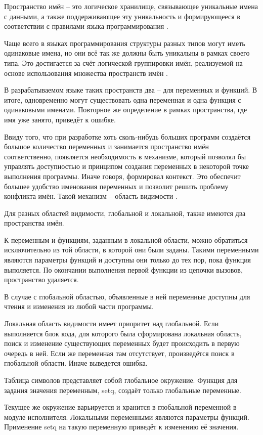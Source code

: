 Пространство имён -- это логическое хранилище, связывающее уникальные имена с данными, а также поддерживающее эту уникальность и формирующееся в соответствии с правилами языка программирования \cite{e18}.

Чаще всего в языках программирования структуры разных типов могут иметь одинаковые имена, но они всё так же должны быть уникальны в рамках своего типа. Это достигается за счёт логической группировки имён, реализуемой на основе использования множества пространств имён \cite{e22}.

В разрабатываемом языке таких пространств два -- для переменных и функций. В итоге, одновременно могут существовать одна переменная и одна функция с одинаковыми именами. Повторное же определение в рамках пространства, где имя уже занято, приведёт к ошибке. 

Ввиду того, что при разработке хоть сколь-нибудь больших программ создаётся большое количество переменных и занимается пространство имён соответственно, появляется необходимость в механизме, который позволял бы управлять доступностью и принципом создания переменных в некоторой точке выполнения программы. Иначе говоря, формировал контекст. Это обеспечит большее удобство именования переменных и позволит решить проблему конфликта имён. Такой механизм -- область видимости \cite{e18}.

Для разных областей видимости, глобальной и локальной, также имеются два пространства имён.

К переменным и функциям, заданным в локальной области, можно обратиться исключительно из той области, в которой они были заданы. Такими переменными являются параметры функций и доступны они только до тех пор, пока функция выполяется. По окончании выполнения первой функции из цепочки вызовов, пространство удаляется.

В случае с глобальной областью, объявленные в ней переменные доступны для чтения и изменения из любой части программы.

Локальная область видимости имеет приоритет над глобальной. Если выполняется блок кода, для которого была сформирована локальная область, поиск и изменение существующих переменных будет происходить в первую очередь в ней. Если же переменная там отсутствует, произведётся поиск в глобальной области. Иначе выведется ошибка.

Таблица символов представляет собой глобальное окружение. Функция для задания значения переменным, setq, создаёт только глобальные переменные.

Текущее же окружение варьируется и хранится в глобальной переменной в модуле исполнителя. Локальными переменными являются параметры функций. Применение setq на такую переменную приведёт к изменению её значения.